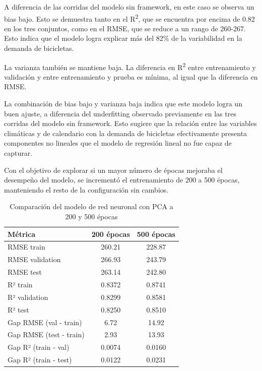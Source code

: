 \documentclass[10pt,journal,compsoc]{IEEEtran}
\begin{document}
A diferencia de las corridas del modelo sin framework, en este caso se observa un bias bajo. Esto se demuestra tanto en el R\textsuperscript{2}, que se encuentra por encima de 0.82 en los tres conjuntos, como en el RMSE, que se reduce a un rango de 260-267. Esto indica que el modelo logra explicar más del 82\% de la variabilidad en la demanda de bicicletas.

La varianza también se mantiene baja. La diferencia en R\textsuperscript{2} entre entrenamiento y validación  y entre entrenamiento y prueba es mínima, al igual que la diferencia en RMSE. 

La combinación de bias bajo y varianza baja indica que este modelo logra un buen ajuste, a diferencia del underfitting observado previamente en las tres corridas del modelo sin framework. Esto sugiere que la relación entre las variables climáticas y de calendario con la demanda de bicicletas efectivamente presenta componentes no lineales que el modelo de regresión lineal no fue capaz de capturar.

Con el objetivo de explorar si un mayor número de épocas mejoraba el desempeño del modelo, se incrementó el entrenamiento de 200 a 500 épocas, manteniendo el resto de la configuración sin cambios. 

\begin{table}[H]
\centering
\caption{Comparación del modelo de red neuronal con PCA a 200 y 500 épocas}
\label{tab:frameworkNN-comparacion}
\begin{tabular}{|l|c|c|}
\hline
\textbf{Métrica} & \textbf{200 épocas} & \textbf{500 épocas} \\
\hline
RMSE train & 260.21 & 228.87 \\
RMSE validation & 266.93 & 243.79 \\
RMSE test & 263.14 & 242.80 \\
\hline
R² train & 0.8372 & 0.8741 \\
R² validation & 0.8299 & 0.8581 \\
R² test & 0.8250 & 0.8510 \\
\hline
Gap RMSE (val - train) & 6.72 & 14.92 \\
Gap RMSE (test - train) & 2.93 & 13.93 \\
Gap R² (train - val) & 0.0074 & 0.0160 \\
Gap R² (train - test) & 0.0122 & 0.0231 \\
\hline
\end{tabular}
\end{table}
\end{document}
